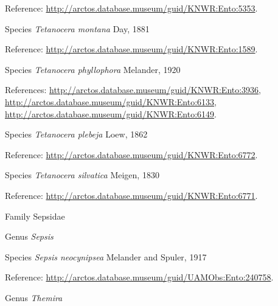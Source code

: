 \documentclass[9pt, article]{memoir}
\begin{document}
\begin{multicols}{2}
\vspace{6pt}Reference: 
\url{http://arctos.database.museum/guid/KNWR:Ento:5353}.

\vspace{6pt}\noindent\hspace{36pt}Species \textit{Tetanocera montana} Day, 1881


\vspace{6pt}Reference: 
\url{http://arctos.database.museum/guid/KNWR:Ento:1589}.

\vspace{6pt}\noindent\hspace{36pt}Species \textit{Tetanocera phyllophora} Melander, 1920


\vspace{6pt}References: 
\url{http://arctos.database.museum/guid/KNWR:Ento:3936}, 
\url{http://arctos.database.museum/guid/KNWR:Ento:6133}, 
\url{http://arctos.database.museum/guid/KNWR:Ento:6149}.

\vspace{6pt}\noindent\hspace{36pt}Species \textit{Tetanocera plebeja} Loew, 1862


\vspace{6pt}Reference: 
\url{http://arctos.database.museum/guid/KNWR:Ento:6772}.

\vspace{6pt}\noindent\hspace{36pt}Species \textit{Tetanocera silvatica} Meigen, 1830


\vspace{6pt}Reference: 
\url{http://arctos.database.museum/guid/KNWR:Ento:6771}.

\vspace{6pt}\noindent\hspace{24pt}Family Sepsidae


\vspace{6pt}\noindent\hspace{30pt}Genus \textit{Sepsis}


\vspace{6pt}\noindent\hspace{36pt}Species \textit{Sepsis neocynipsea} Melander and Spuler, 1917


\vspace{6pt}Reference: 
\url{http://arctos.database.museum/guid/UAMObs:Ento:240758}.

\vspace{6pt}\noindent\hspace{30pt}Genus \textit{Themira}



\end{multicols}
\end{document}
